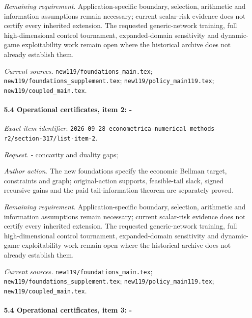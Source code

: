 \par\emph{Remaining requirement.} Application-specific boundary, selection, arithmetic and information assumptions remain necessary; current scalar-risk evidence does not certify every inherited extension. The requested generic-network training, full high-dimensional control tournament, expanded-domain sensitivity and dynamic-game exploitability work remain open where the historical archive does not already establish them.

\par\emph{Current sources.} \nolinkurl{new119/foundations_main.tex}; \nolinkurl{new119/foundations_supplement.tex}; \nolinkurl{new119/policy_main119.tex}; \nolinkurl{new119/coupled_main.tex}.

\paragraph{5.4 Operational certificates, item 2: -}

\emph{Exact item identifier.} \nolinkurl{2026-09-28-econometrica-numerical-methods-r2/section-317/list-item-2}.

\par\emph{Request.} - concavity and duality gaps;

\par\emph{Author action.} The new foundations specify the economic Bellman target, constraints and graph; original-action supports, feasible-tail slack, signed recursive gains and the paid tail-information theorem are separately proved.

\par\emph{Remaining requirement.} Application-specific boundary, selection, arithmetic and information assumptions remain necessary; current scalar-risk evidence does not certify every inherited extension. The requested generic-network training, full high-dimensional control tournament, expanded-domain sensitivity and dynamic-game exploitability work remain open where the historical archive does not already establish them.

\par\emph{Current sources.} \nolinkurl{new119/foundations_main.tex}; \nolinkurl{new119/foundations_supplement.tex}; \nolinkurl{new119/policy_main119.tex}; \nolinkurl{new119/coupled_main.tex}.

\paragraph{5.4 Operational certificates, item 3: -}

